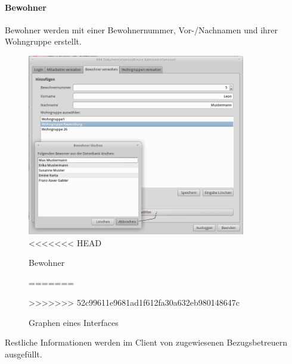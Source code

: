 \paragraph{Bewohner}
Bewohner werden mit einer Bewohnernummer, Vor-/Nachnamen und ihrer Wohngruppe  erstellt. 
\begin{figure}[h]
	\begin{center}
		\includegraphics[keepaspectratio=true, width=0.85\textwidth]{pics/admin2.png}
<<<<<<< HEAD
		\caption{Bewohner}
		\label{Admindialog Bewohner}
=======
		\caption{Graphen eines Interfaces}
		\label{Admindialog_Bewohner}
>>>>>>> 52c99611e9681ad1f612fa30a632eb980148647c
	\end{center}
\end{figure}
\FloatBarrier
\noindent
Restliche Informationen werden im Client von zugewiesenen Bezugsbetreuern ausgefüllt.
\newpage
\noindent
